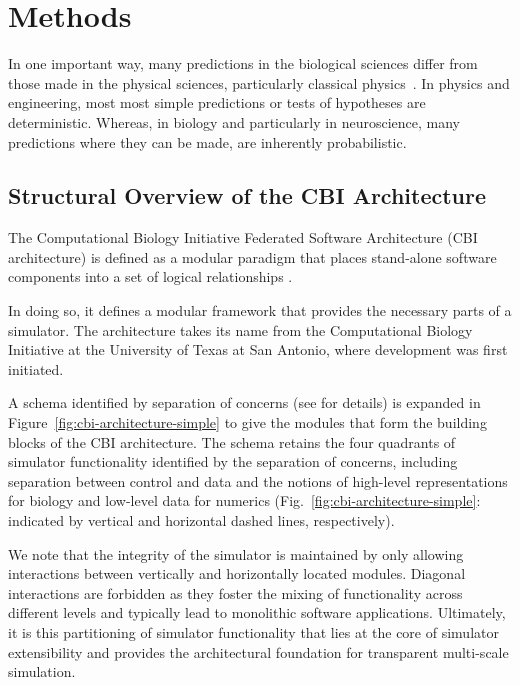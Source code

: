\documentclass{article}
\begin{document}
\section{Methods}

In one important way, many predictions in the biological sciences differ from those made in the physical sciences, particularly classical physics~\cite{darwin71}. In physics and engineering, most most simple predictions or tests of hypotheses are deterministic. Whereas, in biology and particularly in neuroscience, many predictions where they can be made, are inherently probabilistic.

\subsection{Structural Overview of the CBI Architecture}
\label{subsection:CBI-architecture}

The Computational Biology Initiative Federated Software Architecture (CBI architecture) is defined as a modular paradigm that places stand-alone software components into a set of logical relationships \cite{10.1371-journalpone0028956}.

In doing so, it defines a modular framework that provides the
necessary parts of a simulator. The architecture takes its name from the Computational Biology Initiative at the University of Texas at San Antonio, where development was first initiated.

A schema identified by separation of concerns (see
 \cite{10.1371/journal.pone.0028956} for details) is expanded in
Figure~\ref{fig:cbi-architecture-simple} to give the modules that
form the building blocks of the CBI architecture.  The schema retains
the four quadrants of simulator functionality identified by the
separation of concerns, including separation between control and data 
and the notions of high-level representations for biology and low-level data for
numerics (Fig.~\ref{fig:cbi-architecture-simple}: indicated by vertical and
horizontal dashed lines, respectively).

We note that the integrity of the simulator is maintained by only allowing interactions between vertically and horizontally located modules. Diagonal interactions are forbidden as they foster the mixing of functionality across different levels and typically lead to monolithic software applications. Ultimately, it is this partitioning of simulator functionality that lies at the core of simulator extensibility and provides the architectural foundation for transparent multi-scale simulation.
\end{document}
